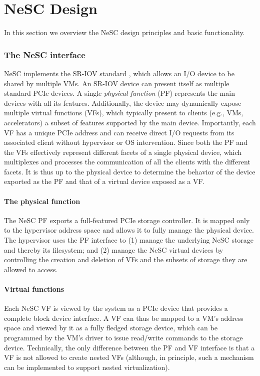 \chapter{NeSC Design}
\label{chap:design}

In this section we overview the NeSC design principles and basic functionality. 

\subsection{The NeSC interface}
NeSC implements the SR-IOV standard \cite{pcisigiov}, which allows an I/O device to be shared by multiple VMs.
An SR-IOV device can present itself as multiple standard PCIe devices. A single \emph{physical function} (PF) represents the main devices with all its features. Additionally, the device may dynamically expose multiple {virtual functions} (VFs), which typically present to clients (e.g., VMs, accelerators) a subset of features supported by the main device. Importantly, each VF has a unique PCIe address and can receive direct I/O requests from its associated client without hypervisor or OS intervention.
%
Since both the PF and the VFs effectively represent different facets of a single physical device, which multiplexes and processes the communication of all the clients with the different facets.
%
It is thus up to the physical device to determine the behavior of the device exported as the PF and that of a virtual device exposed as a VF.

\subsubsection*{The physical function}
The NeSC PF exports a full-featured PCIe storage controller. It is mapped only to the hypervisor address space and allows it to fully manage the physical  device.
The hypervisor uses the PF interface to
(1) manage the underlying NeSC storage and thereby its filesystem;
and (2) manage the NeSC virtual devices by controlling the creation and deletion of VFs and the subsets of storage they are allowed to access.

\subsubsection*{Virtual functions}
Each NeSC VF is viewed by the system as a PCIe device that provides a complete block device interface. A VF can thus be mapped to a VM's address space and viewed by it as a fully fledged storage device, which can be programmed by the VM's driver to issue read/write commands to the storage device. Technically, the only difference between the PF and VF interface is that a VF is not allowed to create nested VFs (although, in principle, such a mechanism can be implemented to support nested virtualization).


